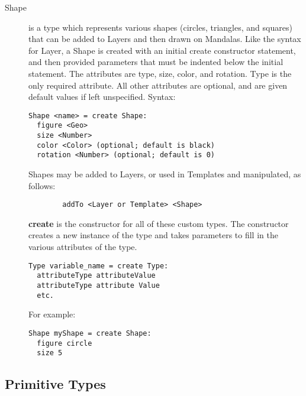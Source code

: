 \documentclass[12pt]{report}
\begin{document}
\begin{description}
    \item[Shape] is a type which represents various shapes (circles, triangles, and squares) that can be added to Layers and then drawn on Mandalas. Like the syntax for Layer, a Shape is created with an initial create constructor statement, and then provided parameters that must be indented below the initial statement. The attributes are type, size, color, and rotation. Type is the only required attribute. All other attributes are optional, and are given default values if left unspecified. Syntax:
 \begin{verbatim}
Shape <name> = create Shape:
  figure <Geo>
  size <Number>
  color <Color> (optional; default is black)
  rotation <Number> (optional; default is 0)
 \end{verbatim}
	
\noindent Shapes may be added to Layers, or used in Templates and manipulated,
as follows:
\begin{verbatim}
		addTo <Layer or Template> <Shape>
\end{verbatim}

\textbf{create} is the constructor for all of these custom types. The constructor  creates a new instance of the type and takes parameters to fill in the various attributes of the type.
\begin{verbatim}
Type variable_name = create Type: 
  attributeType attributeValue
  attributeType attribute Value
  etc.	
\end{verbatim}
For example:
\begin{verbatim}
Shape myShape = create Shape:
  figure circle
  size 5
\end{verbatim}
    
    \end{description}
	
    \subsection*{Primitive Types}
    	
\end{document}
